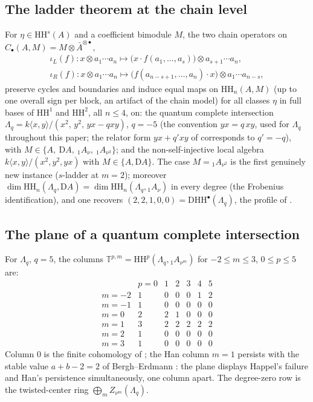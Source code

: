 \documentclass[11pt]{amsart}
\theoremstyle{definition}
\newcommand{\T}{\mathbb{T}}
\newcommand{\HH}{\mathrm{HH}}
\newcommand{\D}{\mathrm{D}}
\newcommand{\kk}{k}
\begin{document}
\subsection{The ladder theorem at the chain level}
For $\eta\in\HH^s(A)$ and a coefficient bimodule $M$, the two chain
operators on $C_\bullet(A,M)=M\otimes\bar A^{\otimes\bullet}$,
\begin{gather*}
\iota_L(f)\colon x\otimes a_1\cdots a_n\mapsto
\bigl(x\cdot f(a_1,\dots,a_s)\bigr)\otimes a_{s+1}\cdots a_n,\\
\iota_R(f)\colon x\otimes a_1\cdots a_n\mapsto
\bigl(f(a_{n-s+1},\dots,a_n)\cdot x\bigr)\otimes a_1\cdots a_{n-s},
\end{gather*}
preserve cycles and boundaries and induce equal maps on
$\HH_n(A,M)$ (up to one overall sign per block, an artifact of the chain
model) for all classes $\eta$ in full bases of $\HH^1$ and $\HH^2$, all
$n\le4$, on: the quantum complete intersection
$\Lambda_q=\kk\langle x,y\rangle/(x^2,\,y^2,\,yx-qxy)$, $q=-5$ (the
convention $yx=q\,xy$, used for $\Lambda_q$ throughout this paper; the relator
form $yx+q'xy$ of \cite{BGMS} corresponds to $q'=-q$), with
$M\in\{A,\ \D A,\ {}_1A_\nu,\ {}_1A_{\nu^2}\}$; and the non-self-injective
local algebra $\kk\langle x,y\rangle/(x^2,y^2,yx)$ with $M\in\{A,\D A\}$.
The case $M={}_1A_{\nu^2}$ is the first genuinely new instance
($s$-ladder at $m=2$); moreover
$\dim\HH_n(\Lambda_q,\D A)=\dim\HH_n(\Lambda_q,{}_1A_\nu)$ in every degree
(the Frobenius identification), and one recovers
$(2,2,1,0,0)=\D\HH^\bullet(\Lambda_q)$, the profile of \cite{BGMS}.

\subsection{The plane of a quantum complete intersection}
For $\Lambda_q$, $q=5$, the columns $\T^{p,m}=\HH^p(\Lambda_q,{}_1A_{\nu^m})$
for $-2\le m\le3$, $0\le p\le5$ are:
\[
\begin{array}{c|cccccc}
 & p=0&1&2&3&4&5\\
\hline
m=-2 & 1&0&0&0&1&2\\
m=-1 & 1&0&0&0&0&0\\
m=0  & 2&2&1&0&0&0\\
m=1  & 3&2&2&2&2&2\\
m=2  & 1&0&0&0&0&0\\
m=3  & 1&0&0&0&0&0
\end{array}
\]
Column $0$ is the finite cohomology of \cite{BGMS}; the Han column $m=1$
persists with the stable value $a+b-2=2$ of Bergh--Erdmann
\cite{BerghErdmann}: the plane displays Happel's failure and Han's
persistence simultaneously, one column apart. The degree-zero row is the
twisted-center ring $\bigoplus_m Z_{\nu^m}(\Lambda_q)$.
\end{document}

